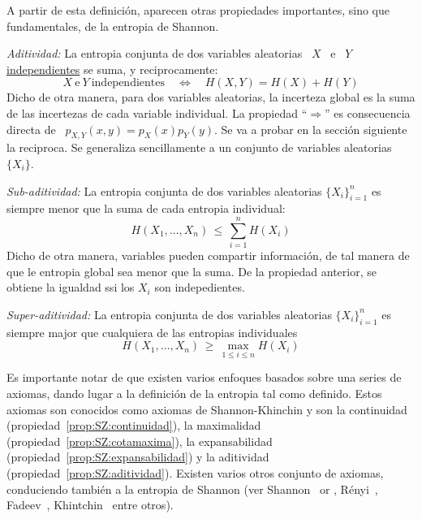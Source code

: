 A partir de esta definici\'on,  aparecen otras propiedades importantes, sino que
fundamentales, de la entropia de Shannon.
%
\begin{propiedades}
\item\label{prop:SZ:aditividad}  {\it Aditividad:} La  entropia conjunta  de dos
  variables aleatorias  \ $X$  \ e \  $Y$ \underline{independientes} se  suma, y
  reciprocamente:
  \[
  X \: \mbox{e} \: Y \: \mbox{independientes} \quad \Leftrightarrow \quad H(X,Y)
  =  H(X) +  H(Y)
  \]
  Dicho de otra manera, para dos variables aleatorias, la incerteza global es la
  suma   de  las  incertezas   de  cada   variable  individual.    La  propiedad
  ``$\Rightarrow$'' es consecuencia directa de \ $p_{X,Y}(x,y) = p_X(x) p_Y(y)$.
  Se  va  a  probar  en  la  secci\'on siguiente  la  reciproca.  Se  generaliza
  sencillamente a un conjunto de variables aleatorias $\{ X_i \}$.
%
\item\label{prop:SZ:subaditividad} {\it Sub-aditividad:} La entropia conjunta de
  dos variables aleatorias  $\{ X_i \}_{i=1}^n$ es siempre menor  que la suma de
  cada entropia individual:
  \[
  H(X_1,\ldots,X_n)  \,  \le \,  \sum_{i=1}^n  H(X_i)
  \]
  Dicho de otra manera, variables  pueden compartir informaci\'on, de tal manera
  de que le entropia global sea menor que la suma.  De la propiedad anterior, se
  obtiene la igualdad ssi los $X_i$ son indepedientes.
%
\item\label{prop:SZ:superaditividad}   {\it   Super-aditividad:}   La   entropia
  conjunta de dos variables aleatorias  $\{ X_i \}_{i=1}^n$ es siempre major que
  cualquiera  de  las entropias  individuales
  \[
  H(X_1,\ldots,X_n) \, \ge \, \max_{1 \le i \le n} H(X_i)
  \]
\end{propiedades}

Es importante notar  de que existen varios enfoques basados  sobre una series de
axiomas, dando lugar  a la definici\'on de la entropia  tal como definido. Estos
axiomas  son conocidos  como axiomas  de Shannon-Khinchin  y son  la continuidad
(propiedad~\ref{prop:SZ:continuidad}),               la              maximalidad
(propiedad~\ref{prop:SZ:cotamaxima}),              la             expansabilidad
(propiedad~\ref{prop:SZ:expansabilidad})         y         la         aditividad
(propiedad~\ref{prop:SZ:aditividad}).  Existen varios otros conjunto de axiomas,
conduciendo tambi\'en a la entropia de Shannon (ver Shannon~\cite[Sec.~6]{Sha48}
or    \cite{ShaWea64},    R\'enyi~\cite{Ren61},   Fadeev~\cite{Fad56,    Fad58},
Khintchin~\cite{Khi57} entre otros).

